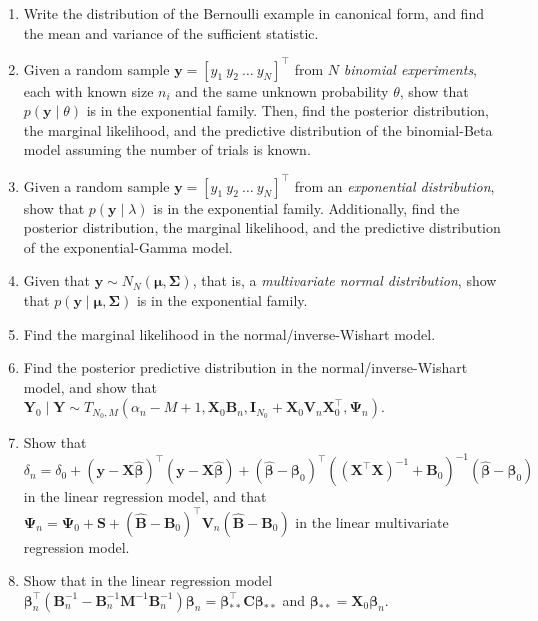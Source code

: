 \begin{enumerate}
	\item Write the distribution of the Bernoulli example in canonical form, and find the mean and variance of the sufficient statistic.
	
	\item Given a random sample \(\bm{y} = [y_1 \ y_2 \ \dots \ y_N]^{\top}\) from \(N\) \textit{binomial experiments}, each with known size \(n_i\) and the same unknown probability \(\theta\), show that \(p(\bm{y} \mid \theta)\) is in the exponential family. Then, find the posterior distribution, the marginal likelihood, and the predictive distribution of the binomial-Beta model assuming the number of trials is known.
	
	\item Given a random sample \(\bm{y} = [y_1 \ y_2 \ \dots \ y_N]^{\top}\) from an \textit{exponential distribution}, show that \(p(\bm{y} \mid \lambda)\) is in the exponential family. Additionally, find the posterior distribution, the marginal likelihood, and the predictive distribution of the exponential-Gamma model.
	
	\item Given that \(\bm{y} \sim N_N(\bm{\mu}, \bm{\Sigma})\), that is, a \textit{multivariate normal distribution}, show that \(p(\bm{y} \mid \bm{\mu}, \bm{\Sigma})\) is in the exponential family.
	
	\item Find the marginal likelihood in the normal/inverse-Wishart model.
		
	\item Find the posterior predictive distribution in the normal/inverse-Wishart model, and show that ${\bm{Y}}_0\mid {\bm{Y}}\sim T_{N_0,M}(\alpha_n-M+1,{\bm{X}}_0{\bm{B}}_n,{\bm{I}}_{N_0}+{\bm{X}}_0{\bm{V}}_n{\bm{X}}_0^{\top},{\bm{\Psi}}_n)$.
	
	\item Show that $\delta_n=\delta_0+({\bm{y}}-{\bm{X}}\hat{\bm{\beta}})^{\top}({\bm{y}}-{\bm{X}}\hat{\bm{\beta}})+(\hat{\bm{\beta}}-\bm{\beta}_0)^{\top}(({\bm{X}}^{\top}{\bm{X}})^{-1}+{\bm{B}}_0)^{-1}(\hat{\bm{\beta}}-\bm{\beta}_0)$ in the linear regression model, and that ${\bm{\Psi}}_{n}={\bm{\Psi}}_{0}+{\bm{S}}+(\hat{\bm{B}}-{\bm{B}}_{0})^{\top}{\bm{V}}_{n}(\hat{\bm{B}}-{\bm{B}}_{0})$ in the linear multivariate regression model. 
			
	\item Show that in the linear regression model $\bm{\beta}_n^{\top}({\bm{B}}_n^{-1}-{\bm{B}}_n^{-1}{\bm{M}}^{-1}{\bm{B}}_n^{-1})\bm{\beta}_n={\bm{\bm{\beta}}}_{**}^{\top}{\bm{C}}{\bm{\bm{\beta}}}_{**}$ and $\bm{\beta}_{**}={\bm{X}}_0\bm{\beta}_n$.
	

\end{enumerate}
